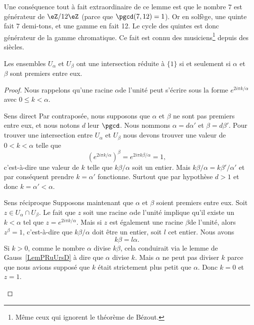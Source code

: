 \begin{example}
Une conséquence tout à fait extraordinaire de ce lemme est que le nombre \( 7\) est générateur de \( \eZ/12\eZ\) (parce que \( \pgcd(7,12)=1\)). Or en solfège, une quinte fait \( 7\) demi-tons, et une gamme en fait 12. Le cycle des quintes est donc générateur de la gamme chromatique\cite{YDXsAM}. Ce fait est connu des musiciens\footnote{Même ceux qui ignorent le théorème de Bézout.} depuis des siècles.
\end{example}

\begin{proposition}      \label{PROPooIOQEooGMcCJm}
    Les ensembles \( U_{\alpha}\) et \( U_{\beta}\) ont une intersection réduite à \( \{ 1 \}\) si et seulement si \( \alpha\) et \( \beta\) sont premiers entre eux.
\end{proposition}

\begin{proof}
    Nous rappelons qu'une racine \( \alpha\)\ieme de l'unité peut s'écrire sous la forme \(  e^{2i\pi k/\alpha}\) avec \( 0\leq k<\alpha\).
    \begin{subproof}
    \item[Sens direct]
        Par contraposée, nous supposons que \( \alpha\) et \( \beta\) ne sont pas premiers entre eux, et nous notons \( d\) leur \( \pgcd\). Nous nommons \( \alpha=d\alpha'\) et \( \beta=d\beta'\). Pour trouver une intersection entre \( U_{\alpha}\) et \( U_{\beta}\) nous devons trouver une valeur de \( 0<k<\alpha\) telle que
        \begin{equation}
            ( e^{2i\pi k/\alpha})^{\beta}= e^{2i\pi k\beta/\alpha}=1,
        \end{equation}
        c'est-à-dire une valeur de \( k\) telle que \( k\beta/\alpha\) soit un entier. Mais \( k\beta/\alpha=k\beta'/\alpha'\) et par conséquent prendre \( k=\alpha'\) fonctionne. Surtout que par hypothèse \( d>1\) et donc \( k=\alpha'<\alpha\).
    \item[Sens réciproque]
        Supposons maintenant que \( \alpha\) et \( \beta \) soient premiers entre eux. Soit \( z\in U_{\alpha}\cap U_{\beta}\). Le fait que \( z\) soit une racine \( \alpha\)\ieme de l'unité implique qu'il existe un \( k<\alpha\) tel que \( z= e^{2i\pi k/\alpha}\). Mais si \( z\) est également une racine \( \beta\)\ieme de l'unité, alors \( z^{\beta}=1\), c'est-à-dire que \( k\beta/\alpha\) doit être un entier, soit \( l\) cet entier. Nous avons
        \begin{equation}
            k\beta=l\alpha.
        \end{equation}
		Si \( k>0\), comme le nombre \( \alpha\) divise \( k\beta\), cela conduirait via le lemme de Gauss~\ref{LemPRuUrsD} à dire que \( \alpha\) divise \( k\). Mais \( \alpha\) ne peut pas diviser \( k\) parce que nous avions supposé que \( k\) était strictement plus petit que \( \alpha\). Donc \( k = 0\) et \( z = 1\).
    \end{subproof}
\end{proof}

